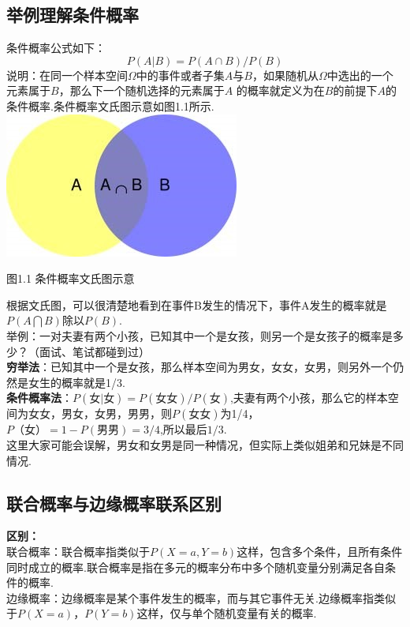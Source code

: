 \subsection{举例理解条件概率}\label{ux4e3eux4f8bux7406ux89e3ux6761ux4ef6ux6982ux7387}

条件概率公式如下：
\[
P(A|B) = P(A\cap B) / P(B)
\]
说明：在同一个样本空间\(\Omega\)中的事件或者子集\(A\)与\(B\)，如果随机从\(\Omega\)中选出的一个元素属于\(B\)，那么下一个随机选择的元素属于\(A\)
的概率就定义为在\(B\)的前提下\(A\)的条件概率.条件概率文氏图示意如图1.1所示.\\
\includegraphics{./img/ch1/conditional_probability.jpg}

图1.1 条件概率文氏图示意

根据文氏图，可以很清楚地看到在事件B发生的情况下，事件A发生的概率就是\(P(A\bigcap B)\)除以\(P(B)\).\\
​举例：一对夫妻有两个小孩，已知其中一个是女孩，则另一个是女孩子的概率是多少？（面试、笔试都碰到过）\\
​\textbf{穷举法}：已知其中一个是女孩，那么样本空间为男女，女女，女男，则另外一个仍然是女生的概率就是1/3.\\
​\textbf{条件概率法}：\(P(女|女)=P(女女)/P(女)\),夫妻有两个小孩，那么它的样本空间为女女，男女，女男，男男，则\(P(女女)\)为1/4，\(P（女）= 1-P(男男)=3/4\),所以最后\(1/3\).\\
这里大家可能会误解，男女和女男是同一种情况，但实际上类似姐弟和兄妹是不同情况.

\subsection{联合概率与边缘概率联系区别}\label{ux8054ux5408ux6982ux7387ux4e0eux8fb9ux7f18ux6982ux7387ux8054ux7cfbux533aux522b}

\textbf{区别：}\\
​联合概率：联合概率指类似于\(P(X=a,Y=b)\)这样，包含多个条件，且所有条件同时成立的概率.联合概率是指在多元的概率分布中多个随机变量分别满足各自条件的概率.\\
​边缘概率：边缘概率是某个事件发生的概率，而与其它事件无关.边缘概率指类似于\(P(X=a)\)，\(P(Y=b)\)这样，仅与单个随机变量有关的概率.

